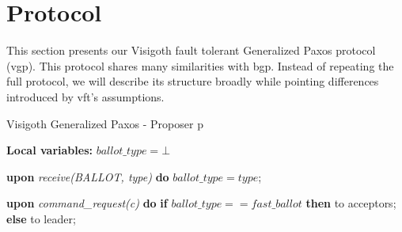 \section{Protocol} 

This section presents our Visigoth fault tolerant Generalized Paxos protocol (\acrshort{vgp}). This protocol shares many similarities with \acrshort{bgp}. Instead of repeating the full protocol, we will describe its structure broadly while pointing differences introduced by \acrshort{vft}'s assumptions.  


\begin{algorithm}
	\caption{Visigoth Generalized Paxos - Proposer p}
	\label{VFT-Prop}
	\textbf{Local variables:} $ballot\_type = \bot$
	\begin{algorithmic}[1]	
		
		\State \textbf{upon} \textit{receive(BALLOT, type)} \textbf{do} 
		\State \hspace{\algorithmicindent} $ballot\_type = type$;
		\State
		
		\State \textbf{upon} \textit{command\_request(c)} \textbf{do}   \hspace{\algorithmicindent}\hspace{\algorithmicindent}\hspace{\algorithmicindent}\hspace{\algorithmicindent}
		\State \hspace{\algorithmicindent} \textbf{if} $ballot\_type == fast\_ballot$ \textbf{then}
		\State \hspace{\algorithmicindent}\hspace{\algorithmicindent}  to acceptors;
		\State \hspace{\algorithmicindent} \textbf{else} 
		\State \hspace{\algorithmicindent}\hspace{\algorithmicindent}  to leader;		
	\end{algorithmic}
\end{algorithm}


